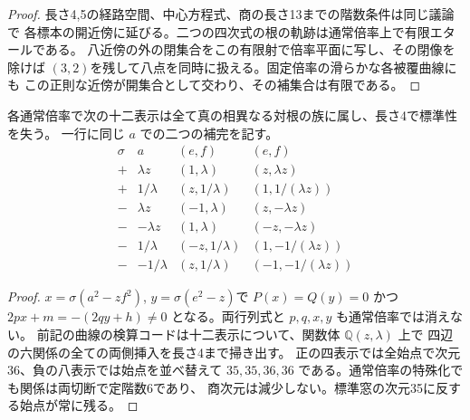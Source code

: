 \begin{proof}
長さ4,5の経路空間、中心方程式、商の長さ13までの階数条件は同じ議論で
各標本の開近傍に延びる。二つの四次式の根の軌跡は通常倍率上で有限エタールである。
八近傍の外の閉集合をこの有限射で倍率平面に写し、その閉像を除けば
$(3,2)$を残して八点を同時に扱える。固定倍率の滑らかな各被覆曲線にも
この正則な近傍が開集合として交わり、その補集合は有限である。
\end{proof}

\begin{proposition}\label{prop:fixed-line-defects}
各通常倍率で次の十二表示は全て真の相異なる対根の族に属し、長さ4で標準性を失う。
一行に同じ $a$ での二つの補完を記す。
\[
\begin{array}{cc|cc}
 \sigma&a&(e,f)&(e,f)\\ \hline
 +&\lambda z&(1,\lambda)&(z,\lambda z)\\
 +&1/\lambda&(z,1/\lambda)&(1,1/(\lambda z))\\
 -&\lambda z&(-1,\lambda)&(z,-\lambda z)\\
 -&-\lambda z&(1,\lambda)&(-z,-\lambda z)\\
 -&1/\lambda&(-z,1/\lambda)&(1,-1/(\lambda z))\\
 -&-1/\lambda&(z,1/\lambda)&(-1,-1/(\lambda z))
\end{array}
\]
\end{proposition}
\begin{proof}
$x=\sigma(a^2-zf^2)$, $y=\sigma(e^2-z)$で $P(x)=Q(y)=0$ かつ
$2px+m=-(2qy+h)\ne0$ となる。両行列式と $p,q,x,y$ も通常倍率では消えない。
前記の曲線の検算コードは十二表示について、関数体 $\mathbb Q(z,\lambda)$ 上で
四辺の六関係の全ての両側挿入を長さ4まで掃き出す。
正の四表示では全始点で次元36、負の八表示では始点を並べ替えて
$35,35,36,36$ である。通常倍率の特殊化でも関係は両切断で定階数6であり、
商次元は減少しない。標準窓の次元35に反する始点が常に残る。
\end{proof}
